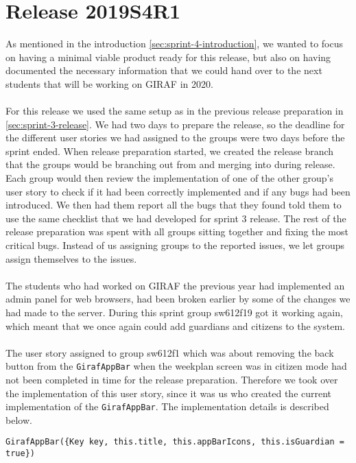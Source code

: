\section{Release 2019S4R1}
As mentioned in the introduction \autoref{sec:sprint-4-introduction}, we wanted to focus on having a minimal viable product ready for this release, but also on having documented the necessary information that we could hand over to the next students that will be working on GIRAF in 2020.
\\\\
For this release we used the same setup as in the previous release preparation in \autoref{sec:sprint-3-release}. 
We had two days to prepare the release, so the deadline for the different user stories we had assigned to the groups were two days before the sprint ended.
When release preparation started, we created the release branch that the groups would be branching out from and merging into during release.
Each group would then review the implementation of one of the other group's user story to check if it had been correctly implemented and if any bugs had been introduced.
We then had them report all the bugs that they found told  them to use the same checklist that we had developed for sprint 3 release.
The rest of the release preparation was spent with all groups sitting together and fixing the most critical bugs.
Instead of us assigning groups to the reported issues, we let groups assign themselves to the issues.
\\\\
The students who had worked on GIRAF the previous year had implemented an admin panel for web browsers, had been broken earlier by some of the changes we had made to the server.
During this sprint group sw612f19 got it working again, which meant that we once again could add guardians and citizens to the system.
\\\\
The user story assigned to group sw612f1 which was about removing the back button from the \texttt{GirafAppBar} when the weekplan screen was in citizen mode had not been completed in time for the release preparation.
Therefore we took over the implementation of this user story, since it was us who created the current implementation of the \texttt{GirafAppBar}.
The implementation details is described below.
\begin{lstlisting}[caption={Removing back button from the citizens screen},label={lst:removeBackButton},language={[Sharp]C}]
    GirafAppBar({Key key, this.title, this.appBarIcons, this.isGuardian = true})
\end{lstlisting}
